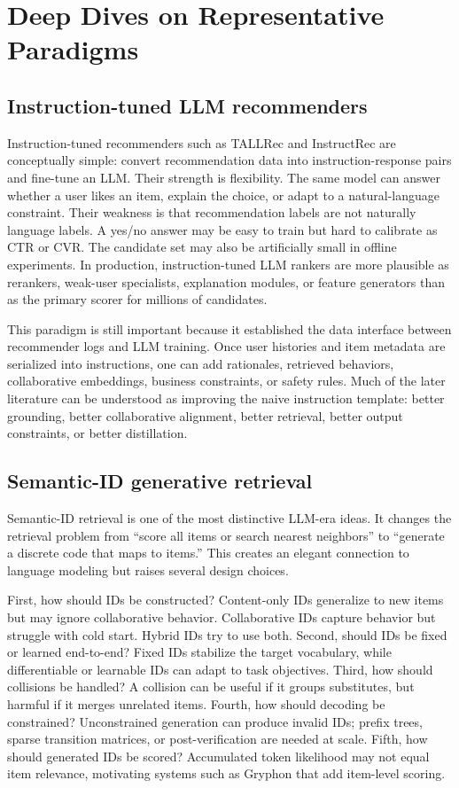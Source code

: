 \documentclass[11pt]{article}
\begin{document}
\section{Deep Dives on Representative Paradigms}

\subsection{Instruction-tuned LLM recommenders}

Instruction-tuned recommenders such as TALLRec and InstructRec are conceptually simple: convert recommendation data into instruction-response pairs and fine-tune an LLM. Their strength is flexibility. The same model can answer whether a user likes an item, explain the choice, or adapt to a natural-language constraint. Their weakness is that recommendation labels are not naturally language labels. A yes/no answer may be easy to train but hard to calibrate as CTR or CVR. The candidate set may also be artificially small in offline experiments. In production, instruction-tuned LLM rankers are more plausible as rerankers, weak-user specialists, explanation modules, or feature generators than as the primary scorer for millions of candidates.

This paradigm is still important because it established the data interface between recommender logs and LLM training. Once user histories and item metadata are serialized into instructions, one can add rationales, retrieved behaviors, collaborative embeddings, business constraints, or safety rules. Much of the later literature can be understood as improving the naive instruction template: better grounding, better collaborative alignment, better retrieval, better output constraints, or better distillation.

\subsection{Semantic-ID generative retrieval}

Semantic-ID retrieval is one of the most distinctive LLM-era ideas. It changes the retrieval problem from ``score all items or search nearest neighbors'' to ``generate a discrete code that maps to items.'' This creates an elegant connection to language modeling but raises several design choices.

First, how should IDs be constructed? Content-only IDs generalize to new items but may ignore collaborative behavior. Collaborative IDs capture behavior but struggle with cold start. Hybrid IDs try to use both. Second, should IDs be fixed or learned end-to-end? Fixed IDs stabilize the target vocabulary, while differentiable or learnable IDs can adapt to task objectives. Third, how should collisions be handled? A collision can be useful if it groups substitutes, but harmful if it merges unrelated items. Fourth, how should decoding be constrained? Unconstrained generation can produce invalid IDs; prefix trees, sparse transition matrices, or post-verification are needed at scale. Fifth, how should generated IDs be scored? Accumulated token likelihood may not equal item relevance, motivating systems such as Gryphon that add item-level scoring.
\end{document}
